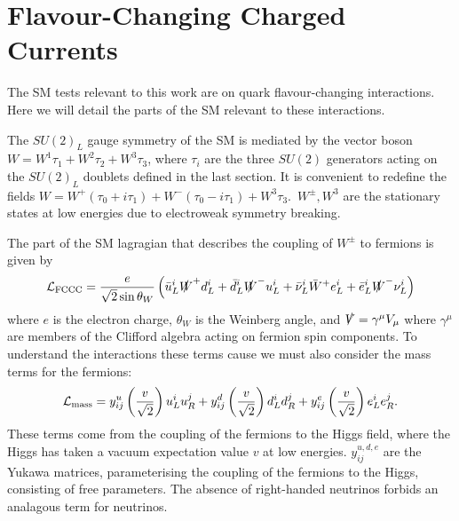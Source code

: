 \section{Flavour-Changing Charged Currents}
\label{sec:fccc}

The SM tests relevant to this work are on quark flavour-changing interactions. Here we will detail the parts of the SM relevant to these interactions. 

The $SU(2)_L$ gauge symmetry of the SM is mediated by the vector boson $W=W^1\tau_1 + W^2\tau_2 + W^3\tau_3$, where $\tau_i$ are the three $SU(2)$ generators acting on the $SU(2)_L$ doublets defined in the last section. It is convenient to redefine the fields $W = W^+ ( \tau_0 + i\tau_1 ) + W^- ( \tau_0 - i\tau_1 ) + W^3 \tau_3$.\, $W^{\pm},W^3$ are the stationary states at low energies due to electroweak symmetry breaking. 

The part of the SM lagragian that describes the coupling of $W^{\pm}$ to fermions is given by
\begin{align}
  \mathcal{L}_{\text{FCCC}} = {e\over \sqrt{2}\sin\theta_W} \left( \bar{u}_L^i \slashed{W}^+ d_L^i + \bar{d}_L^i \slashed{W}^- u_L^i + \bar{\nu}_L^i \bar{W}^+ e_L^i + \bar{e}_L^i \slashed{W}^- \nu_L^i \right)
  \label{eq:FCCC}
\end{align}
where $e$ is the electron charge, $\theta_W$ is the Weinberg angle, and $\slashed{V} = \gamma^{\mu} V_{\mu}$ where $\gamma^{\mu}$ are members of the Clifford algebra acting on fermion spin components. To understand the interactions these terms cause we must also consider the mass terms for the fermions:
\begin{align}
  \mathcal{L}_{\text{mass}} = y_{ij}^u \left({v\over \sqrt{2}}\right) u_L^i u_R^j + y_{ij}^d \left({v\over \sqrt{2}}\right) d_L^i d_R^j + y_{ij}^e \left({v\over \sqrt{2}}\right) e_L^i e_R^j.
\end{align}
These terms come from the coupling of the fermions to the Higgs field, where the Higgs has taken a vacuum expectation value $v$ at low energies. $y^{u,d,e}_{ij}$ are the Yukawa matrices, parameterising the coupling of the fermions to the Higgs, consisting of free parameters. The absence of right-handed neutrinos forbids an analagous term for neutrinos.

